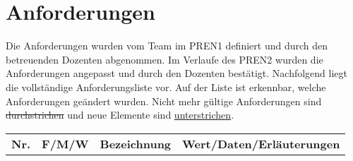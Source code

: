 \section{Anforderungen}

Die Anforderungen wurden vom Team im PREN1 definiert und durch den betreuenden Dozenten abgenommen. Im Verlaufe des PREN2 wurden die Anforderungen angepasst und durch den Dozenten bestätigt. Nachfolgend liegt die vollständige Anforderungsliste vor. Auf der Liste ist erkennbar, welche Anforderungen geändert wurden. Nicht mehr gültige Anforderungen sind \sout{durchstrichen} und neue Elemente sind \uline{unterstrichen}.

\begin{longtable}[l]{|l|c|l|p{8.5cm}|}
	\hline
	\textbf{Nr.} & \textbf{F/M/W} & \textbf{Bezeichnung} & \textbf{Wert/Daten/Erläuterungen} \endhead
	

\end{longtable}
